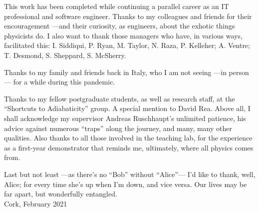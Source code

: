 {
  This work has been completed while continuing a parallel career
  as an IT professional and software engineer.
  Thanks to my
  colleagues and friends for their encouragement
  ---and their curiosity,
  as engineers,
  about the exhotic things physicists do.
  I also want to thank those managers
  who have, in various ways, facilitated this:
  I. Siddiqui, P. Ryan, M. Taylor, N. Raza, P. Kelleher;
  A. Ventre;
  T. Desmond, S. Sheppard, S. McSherry.
  
  Thanks to my family and friends back in Italy,
  who I am not seeing ---in person--- for a while during this pandemic.

  Thanks to my fellow postgraduate students,
  as well as research staff,
  at the ``Shortcuts to Adiabaticity'' group.
  A special mention to David Rea.
  Above all, I shall acknowledge my supervisor Andreas Ruschhaupt's unlimited patience,
  his advice against numerous ``traps'' along the journey, and many, many other qualities.
  Also thanks to all those involved in the teaching lab, for the experience as a
  first-year demonstrator that reminds me, ultimately, where all physics comes from.

  Last but not least ---as there's no ``Bob'' without ``Alice''---
  I'd like to thank, well, Alice;
  for every time she’s up when I'm down, and vice versa.
  Our lives may be far apart, but
  wonderfully entangled.
  \\

  Cork, February 2021
}